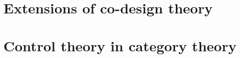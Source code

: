 {\chapter{}

\clearpage
%
\chapter{}

\clearpage
%
%
\part{ Extensions of co-design theory}
%
%
\chapter{}

%
}
%
%
%
\part{Control theory in category theory}
%
%
%
%

%
%
%
%
\printbibliography